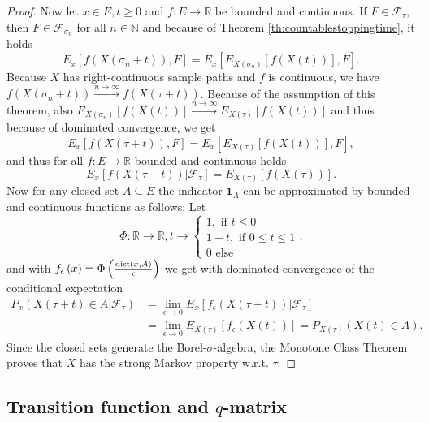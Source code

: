 \documentclass[12pt,a4paper]{scrartcl}
\numberwithin{equation}{section}
\newcommand{\R}{\mathbb{R}} %
\newcommand{\N}{\mathbb{N}} %
\begin{document}
\begin{proof}
Now let $x \in E, t\geq 0$ and $f:E \to \R$ be bounded and continuous. If $F \in \mathcal{F}_{\tau}$, then $F \in \mathcal{F}_{\sigma_n}$ for all $n \in \N$ and because of Theorem \ref{th:countablestoppingtime}, it holds
$$ E_x\left[ f\left(X\left(\sigma_n + t \right) \right), F \right] = E_x\left[E_{X\left(\sigma_n\right)}\left[f\left(X\left(t\right) \right) \right], F \right].$$
Because $X$ has right-continuous sample paths and $f$ is continuous, we have $f\left(X\left(\sigma_n + t \right) \right) \overset{n \to \infty}{\to} f\left(X\left(\tau + t \right) \right)$. Because of the assumption of this theorem, also $E_{X\left(\sigma_n\right)}\left[f\left(X\left(t\right) \right) \right] \overset{n \to \infty}{\to} E_{X\left(\tau\right)}\left[f\left(X\left(t\right) \right) \right]$ and thus because of dominated convergence, we get 
$$ E_x\left[ f\left(X\left(\tau + t \right) \right), F \right] = E_x\left[E_{X\left(\tau\right)}\left[f\left(X\left(t\right) \right) \right], F \right],$$
and thus for all $f:E \to \R$ bounded and continuous holds
$$ E_x\left[ f\left(X\left(\tau + t \right) \right)  |\mathcal{F}_{\tau}\right] = E_{X\left(\tau \right)}\left[f\left(X\left(\tau\right)\right) \right].$$
Now for any closed set $ A \subseteq E $ the indicator $\textbf{1}_{A}$ can be approximated by bounded and continuous functions as follows: Let $$\Phi: \R \to \R, t \to \begin{cases} 1, \mbox{ if } t \leq 0 \\1-t, \mbox{ if } 0 \leq t \leq 1 \\0 \mbox{ else }   \end{cases}.$$
and with $f_{\epsilon}\left(x\right) = \Phi\left( \frac{ \textnormal{dist}\left(x,A\right)}{\epsilon} \right)$ we get with dominated convergence of the conditional expectation
\begin{align*}
P_x\left(X\left(\tau + t \right) \in A | \mathcal{F}_{\tau}\right) &= \lim_{\epsilon \to 0} E_x\left[ f_{\epsilon}\left(X\left(\tau + t\right) \right) | \mathcal{F}_{\tau}\right] \\
&= \lim_{\epsilon \to 0} E_{X\left(\tau\right)} \left[f_{\epsilon}\left(X\left(t\right) \right) \right] = P_{X\left(\tau \right)}\left(X\left(t\right) \in A \right).
\end{align*}
Since the closed sets generate the Borel-$\sigma$-algebra, the Monotone Class Theorem proves that $X$ has the strong Markov property w.r.t. $\tau$.
\end{proof}

\subsection{Transition function and $q$-matrix}
\end{document}
